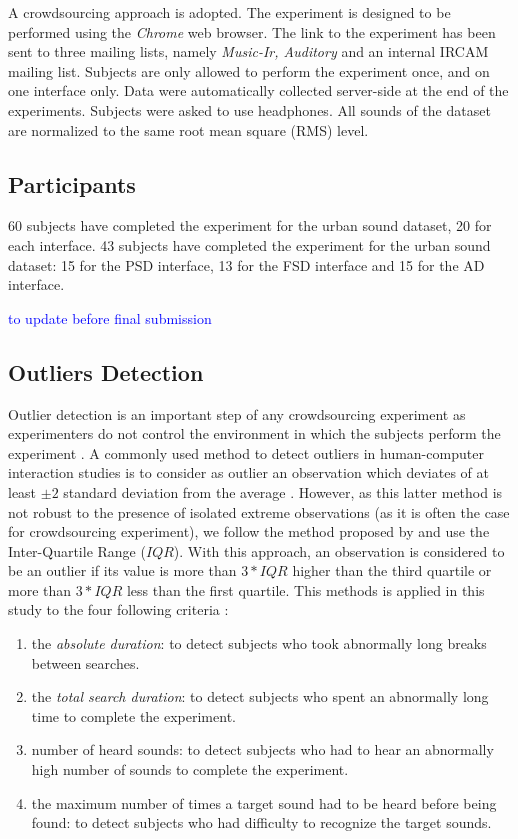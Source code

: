 \documentclass{aes2e}
\newcommand{\ml}[2][]{\textcolor{blue}{#1 #2}}
\begin{document}
A crowdsourcing approach is adopted. The experiment is designed to be performed using the \textit{Chrome} web browser. The link to the experiment has been sent to three  mailing lists, namely \textit{Music-Ir, Auditory} and an internal IRCAM mailing list. Subjects are only allowed to perform the experiment once, and on one interface only. Data were automatically collected server-side at the end of the experiments. Subjects were asked to use headphones. All sounds of the dataset are normalized to the same root mean square (RMS) level.

\subsection{Participants}

60 subjects have completed the experiment for the urban sound dataset, 20 for each interface. 43 subjects have completed the experiment for the urban sound dataset: 15 for the PSD interface, 13 for the FSD interface and 15 for the AD interface.

\ml{to update before final submission}

\subsection{Outliers Detection}

Outlier detection is an important step of any crowdsourcing experiment as experimenters do not control the environment in which the subjects perform the experiment \cite{komarov2013crowdsourcing,buchholz2011crowdsourcing}. A commonly used method to detect outliers in  human-computer interaction studies is to consider as outlier an observation  which deviates of at least $\pm2$ standard deviation from the average \cite{komarov2013crowdsourcing}. However, as this latter method is not robust to the presence of isolated extreme observations (as it is often the case for crowdsourcing experiment), we follow the  method proposed by \cite{komarov2013crowdsourcing} and use the Inter-Quartile Range ($IQR$). With this approach, an observation is considered to be an outlier if its value is more than $3*IQR$ higher than the third quartile or more than $3*IQR$ less than the first quartile. This methods is applied in this study to the four following criteria :

\begin{enumerate}
\item the \textit{absolute duration}: to detect subjects who took abnormally long breaks between searches.
\item the \textit{total search duration}: to detect subjects who spent an abnormally long time to complete the experiment.
\item number of heard sounds: to detect subjects who had to hear an abnormally high number of sounds to complete the experiment.
\item the maximum number of times a target sound had to be heard before being found: to detect subjects who had difficulty to recognize the target sounds.
\end{enumerate}
\end{document}
